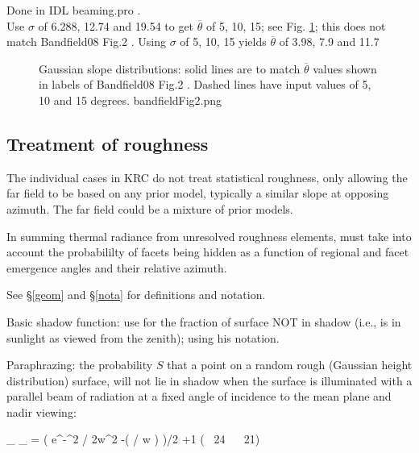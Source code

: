 \documentclass{article}
\newcommand{\erfc}{\mathrm{erfc}}  %
\newcommand{\qeq}{\hspace{25.mm}} %
\begin{document}
Done in IDL beaming.pro . \\ Use $\sigma$ of 6.288, 12.74 and 19.54 to get
$\overline{\theta}$ of 5, 10, 15; see Fig. \ref{bandfieldFig2}; this does not
match Bandfield08 Fig.2 .  Using $\sigma$ of 5, 10, 15 yields
$\overline{\theta}$ of 3.98, 7.9 and 11.7

\begin{figure}[!ht] 
\caption[Gaussian slopes ]{Gaussian slope distributions: solid lines are to
  match $\overline{\theta}$ values shown in labels of Bandfield08 Fig.2 . Dashed
  lines have input values of 5, 10 and 15 degrees.
\label{bandfieldFig2} bandfieldFig2.png  }
\end{figure} 

\pagebreak
\subsection{Treatment of roughness}  %

The individual cases in KRC do not treat statistical roughness, only allowing
the far field to be based on any prior model, typically a similar slope at
opposing azimuth. The far field could be a mixture of prior models.

In summing thermal radiance from unresolved roughness elements, must take into
account the probabililty of facets being hidden as a function of regional and
facet emergence angles and their relative azimuth.

 See \S \ref{geom} and \S \ref{nota} for definitions and notation.

Basic shadow function: use  for the fraction of surface NOT in 
shadow (i.e., is in sunlight as viewed from the zenith); using his notation. %

Paraphrazing: the probability $S$ that a point on a random rough (Gaussian height
distribution) surface, will not lie in shadow when the surface is illuminated
with a parallel beam of radiation at a fixed angle of incidence to the mean
plane and nadir viewing:

\qbn {}_{} \Leftarrow  {}_{} = \frac{ 1- \frac{1}{2} \erfc \left( \mu / \sqrt{2} w \right) } 
{\left(  \cdot {}
e^{-\mu^2 / 2w^2} -\erfc \left(  \mu /  w \right) \right)/2  +1 } \qeq ( \ 24 \  \ 21) \qen
\end{document}

